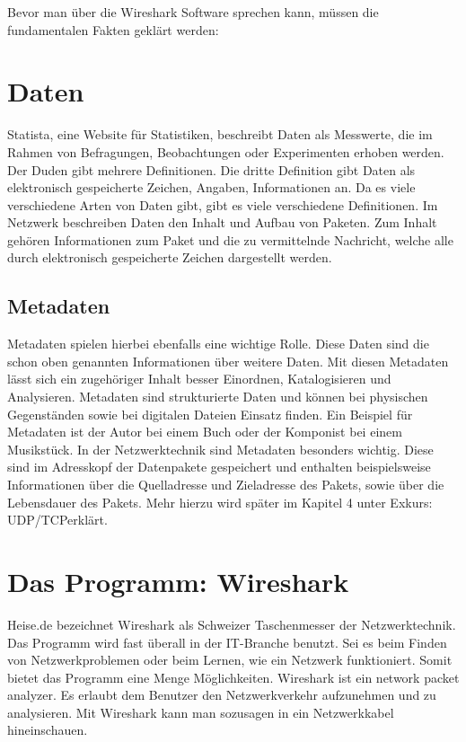 \documentclass[12pt]{article}
\begin{document}
Bevor man über die Wireshark Software sprechen kann, müssen die fundamentalen Fakten geklärt werden:

\section{Daten}
Statista, eine Website für Statistiken,  beschreibt Daten als \glqq Messwerte, die im Rahmen von Befragungen, Beobachtungen oder Experimenten erhoben werden\grqq. \cite{statista-daten} Der Duden gibt mehrere Definitionen. Die dritte Definition gibt Daten als \glqq elektronisch gespeicherte Zeichen, Angaben, Informationen\grqq\cite{duden-daten} an. Da es viele verschiedene Arten von Daten gibt, gibt es viele verschiedene Definitionen. Im Netzwerk beschreiben Daten den Inhalt und Aufbau von Paketen. Zum Inhalt gehören Informationen zum Paket und die zu vermittelnde Nachricht, welche alle durch elektronisch gespeicherte Zeichen dargestellt werden.

\subsection{Metadaten}
Metadaten spielen hierbei ebenfalls eine wichtige Rolle. Diese Daten sind die schon oben genannten Informationen über weitere Daten. Mit diesen Metadaten lässt sich ein zugehöriger Inhalt besser Einordnen, Katalogisieren und Analysieren. Metadaten sind strukturierte Daten und können bei physischen Gegenständen sowie bei digitalen Dateien Einsatz finden. Ein Beispiel für Metadaten ist der Autor bei einem Buch oder der Komponist bei einem Musikstück.\cite{metadaten-security-insider} In der Netzwerktechnik sind Metadaten besonders wichtig. Diese sind im Adresskopf der Datenpakete gespeichert und enthalten beispielsweise Informationen über die Quelladresse und Zieladresse des Pakets, sowie über die Lebensdauer des Pakets.\cite{tcp+ip-netzwerkecom} Mehr hierzu wird später im Kapitel 4 unter \glq Exkurs: UDP/TCP\grq erklärt.

\section{Das Programm: Wireshark}

Heise.de bezeichnet Wireshark als \glqq Schweizer Taschenmesser\grqq\cite{schweizer-taschenmesser} der Netzwerktechnik. Das Programm wird fast überall in der IT-Branche benutzt. Sei es beim Finden von Netzwerkproblemen oder beim Lernen, wie ein Netzwerk funktioniert. Somit bietet das Programm eine Menge Möglichkeiten. Wireshark ist ein \glqq network packet analyzer\grqq\cite{what-is-wireshark}. Es erlaubt dem Benutzer den Netzwerkverkehr aufzunehmen und zu analysieren. Mit Wireshark kann man sozusagen in ein Netzwerkkabel \glq hineinschauen\grq.
\end{document}
